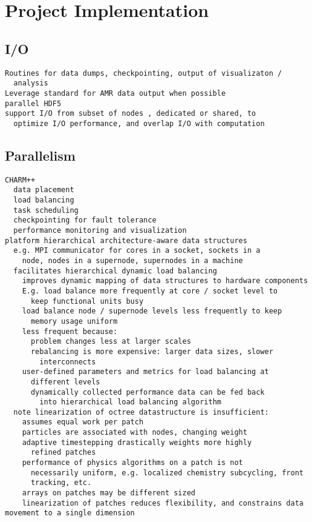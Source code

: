 \documentclass[14pt,letter]{article}
\begin{document}
\section{Project Implementation}

\subsection{I/O}

\begin{verbatim}
Routines for data dumps, checkpointing, output of visualizaton /
  analysis
Leverage standard for AMR data output when possible
parallel HDF5
support I/O from subset of nodes , dedicated or shared, to
  optimize I/O performance, and overlap I/O with computation

\end{verbatim}

\subsection{Parallelism}

\begin{verbatim}
CHARM++ 
  data placement
  load balancing
  task scheduling
  checkpointing for fault tolerance
  performance monitoring and visualization
platform hierarchical architecture-aware data structures
  e.g. MPI communicator for cores in a socket, sockets in a
    node, nodes in a supernode, supernodes in a machine
  facilitates hierarchical dynamic load balancing
    improves dynamic mapping of data structures to hardware components
    E.g. load balance more frequently at core / socket level to
      keep functional units busy
    load balance node / supernode levels less frequently to keep
      memory usage uniform
    less frequent because:
      problem changes less at larger scales
      rebalancing is more expensive: larger data sizes, slower
        interconnects
    user-defined parameters and metrics for load balancing at
      different levels
      dynamically collected performance data can be fed back
        into hierarchical load balancing algorithm
  note linearization of octree datastructure is insufficient:
    assumes equal work per patch
    particles are associated with nodes, changing weight
    adaptive timestepping drastically weights more highly
      refined patches
    performance of physics algorithms on a patch is not
      necessarily uniform, e.g. localized chemistry subcycling, front
      tracking, etc.
    arrays on patches may be different sized
    linearization of patches reduces flexibility, and constrains data movement to a single dimension
\end{verbatim}
\end{document}
